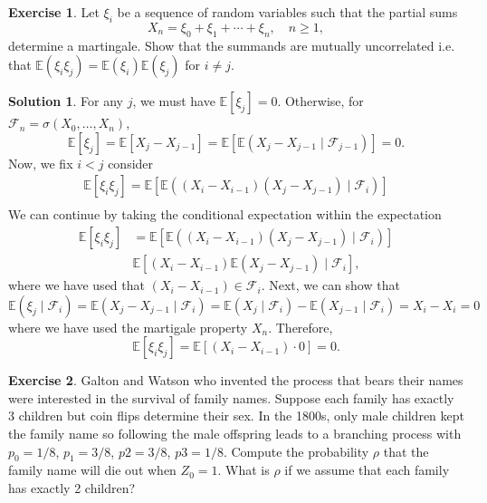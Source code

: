 \documentclass[12pt]{article}
\newcommand{\calF}{\mathcal{F}}
\newcommand{\Expect}{\mathbb{E}}
\theoremstyle{definition}
\newtheorem{exer}{Exercise}
\newtheorem{sol}{Solution}
\theoremstyle{remark}
\begin{document}
\begin{exer}
    Let $\xi_i$ be a sequence of random variables such that the partial sums
    \begin{equation}
        X_n= \xi_0 + \xi_1 + \cdots + \xi_n, \quad n\geq 1,
    \end{equation}
    determine a martingale. Show that the summands are mutually uncorrelated i.e. that $\Expect(\xi_i\xi_j) = \Expect(\xi_i)\Expect(\xi_j)$ for $i\neq j$.
 \end{exer}
\begin{sol}\leavevmode
    For any $j$, we must have $\Expect[\xi_j] = 0$. Otherwise, for $\calF_n = \sigma(X_0, \ldots, X_n)$, 
\begin{equation} 
        \Expect[\xi_j] = \Expect[X_j - X_{j-1}] = \Expect[ \Expect(X_j - X_{j-1} \mid \calF_{j-1}) ] = 0.
\end{equation}
  Now, we fix $i<j$ consider
    \begin{align}
      \Expect[\xi_i \xi_j] = \Expect[ \Expect( (X_i - X_{i-1})(X_j - X_{j-1})\mid \calF_i)]\\
    \end{align}
We can continue by taking the conditional expectation within the expectation
  \begin{align}
      \Expect[\xi_i \xi_j] &= \Expect[ \Expect( (X_i - X_{i-1})(X_j - X_{j-1})\mid \calF_i)]\\
                           & \Expect[ (X_i - X_{i-1}) \Expect(X_j - X_{j-1}) \mid \calF_i ],
  \end{align}
  where we have used that $(X_i - X_{i-1}) \in \calF_i$. Next, we can show that
  \begin{equation}
      \Expect(\xi_j \mid \calF_i) = \Expect(X_{j}-X_{j-1}\mid \calF_i) = \Expect(X_j\mid \calF_i) -  \Expect(X_{j-1}\mid \calF_i) = X_i - X_i = 0 
  \end{equation}
  where we have used the martigale property $X_n$. Therefore,
  \begin{equation}
      \Expect[\xi_i \xi_j] = \Expect[ (X_i - X_{i-1}) \cdot 0 ] = 0. 
  \end{equation}
\end{sol}
\newpage

\begin{exer}
Galton and Watson who invented the process that bears their names were interested in the survival of family names. Suppose each family has exactly 3 children but coin flips determine their sex. In the 1800s, only male children kept the family name so following the male offspring leads to a branching process with $p_0 = 1/8$, $p_1 = 3/8$, $p2 = 3/8$, $p3 = 1/8$. Compute the probability $\rho$ that the family name will die out when $Z_0 = 1$. What is $\rho$ if we assume that each family has exactly 2 children?
\end{exer}
\end{document}
